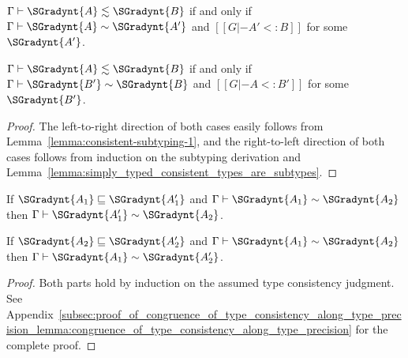 \begin{corollary}
  \label{corollary:consistent_subtyping}
  \begin{enumR}
  \item[]
  \item $ \Gamma  \vdash  \SGradynt{A}  \lesssim  \SGradynt{B} $ if and only if $ \Gamma  \vdash  \SGradynt{A}  \sim  \SGradynt{A'} $ and $[[G |- A' <: B]]$ for some $\SGradynt{A'}$.
  \item $ \Gamma  \vdash  \SGradynt{A}  \lesssim  \SGradynt{B} $ if and only if $ \Gamma  \vdash  \SGradynt{B'}  \sim  \SGradynt{B} $ and $[[G |- A <: B']]$ for some $\SGradynt{B'}$.
  \end{enumR}
\end{corollary}
\begin{proof}
  The left-to-right direction of both cases easily follows from
  Lemma~\ref{lemma:consistent-subtyping-1}, and the right-to-left
  direction of both cases follows from induction on the subtyping
  derivation and Lemma~\ref{lemma:simply_typed_consistent_types_are_subtypes}.
\end{proof}

\begin{lemma}
  \label{lemma:congruence_of_type_consistency_along_type_precision}
  \begin{enumR}
  \item[] 
  \item If $ \SGradynt{A_{{\mathrm{1}}}}  \sqsubseteq  \SGradynt{A'_{{\mathrm{1}}}} $ and $ \Gamma  \vdash  \SGradynt{A_{{\mathrm{1}}}}  \sim  \SGradynt{A_{{\mathrm{2}}}} $ then
    $ \Gamma  \vdash  \SGradynt{A'_{{\mathrm{1}}}}  \sim  \SGradynt{A_{{\mathrm{2}}}} $.
    
  \item If $ \SGradynt{A_{{\mathrm{2}}}}  \sqsubseteq  \SGradynt{A'_{{\mathrm{2}}}} $ and $ \Gamma  \vdash  \SGradynt{A_{{\mathrm{1}}}}  \sim  \SGradynt{A_{{\mathrm{2}}}} $ then
    $ \Gamma  \vdash  \SGradynt{A_{{\mathrm{1}}}}  \sim  \SGradynt{A'_{{\mathrm{2}}}} $.  
  \end{enumR}
\end{lemma}
\begin{proof}
  Both parts hold by induction on the assumed type consistency
  judgment.  See
  Appendix~\ref{subsec:proof_of_congruence_of_type_consistency_along_type_precision_lemma:congruence_of_type_consistency_along_type_precision}
  for the complete proof.
\end{proof}

